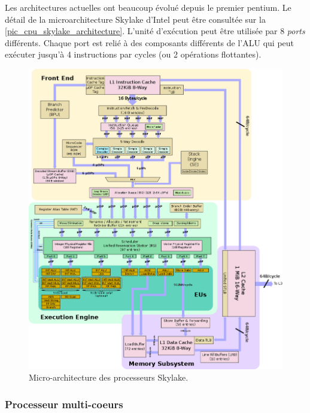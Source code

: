             
            
            Les architectures actuelles ont beaucoup évolué depuis le premier pentium. Le détail de la microarchitecture Skylake d'Intel peut être consultée sur la \autoref{pic_cpu_skylake_architecture}. L'unité d'exécution peut être utilisée par 8 \textit{ports} différents. Chaque port est relié à des composants différents de l'ALU qui peut exécuter jusqu'à 4 instructions par cycles (ou 2 opérations flottantes).
            
            
            \begin{figure}[hbtp]
                \center
                \includegraphics[width=14cm]{images/cpu_skylake_architecture.png}
                \caption{\label{pic_cpu_skylake_architecture}Micro-architecture des processeurs Skylake.}
            \end{figure}
            
            

    
    
    \subsubsection{Processeur multi-coeurs} \label{sec:multicore}
    
